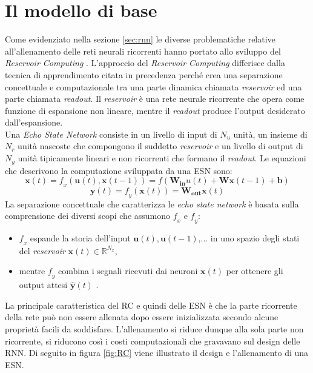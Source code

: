 
\section{Il modello di base}
Come evidenziato nella sezione \ref{sec:rnn} le diverse problematiche relative all'allenamento delle reti neurali ricorrenti hanno portato allo sviluppo del \textit{Reservoir Computing }. L'approccio del \textit{Reservoir Computing} differisce dalla tecnica di apprendimento citata in precedenza perché crea una separazione concettuale e computazionale tra una parte dinamica chiamata  \textit{reservoir} ed una parte chiamata \textit{readout}. Il \textit{reservoir} è una  rete neurale ricorrente che opera come funzione di espansione non lineare, mentre il \textit{readout} produce l'output desiderato dall'espansione. \\

Una \textit{Echo State Network} consiste in un livello di input di $N_u$ unità, un insieme di $N_r$ unità nascoste che compongono il suddetto \textit{reservoir} e un livello di output di $N_y$ unità tipicamente lineari e non ricorrenti che formano il \textit{readout}.
Le equazioni che descrivono la computazione sviluppata da una ESN sono:
\begin{equation}\label{attivazioneesn}
\mathbf{x}(\mathit{t})= \mathit{f}_\mathit{x} (\mathbf{u}(\mathit{t}), \mathbf{x}(\mathit{t} - 1)) = f(\mathbf{W_{in}}u(\mathit{t}) + \mathbf{Wx}(\mathit{t - 1} ) + \mathbf{b} )
\end{equation}
\begin{equation}\label{output}
\mathbf{y}(\mathit{t})=\mathit{f_{y}}(\mathbf{x}(\mathit{t}) )= \mathbf{W_{out}}\mathbf{x}(\mathit{t})
\end{equation}
La separazione concettuale che caratterizza le \textit{echo state network} è basata sulla comprensione dei diversi scopi che assumono $\mathit{f_{x}}$ e $\mathit{f_{y}}$:
\begin{itemize}
	\item $\mathit{f_{x}}$ espande la storia dell'input $\mathbf{u}\mathit{(t)}, \mathbf{u}\mathit{(t-1)}$,... in uno spazio degli stati del \textit{reservoir}  $\mathbf{x}\mathit{(t)} \in \mathds{R}^{N_x}$,
	\item mentre $\mathit{f_{y}}$ combina i segnali ricevuti dai neuroni $\mathbf{x}(\mathit{t})$ per ottenere gli output attesi $\hat{\mathbf{y}}(\mathit{t})$ .\\
\end{itemize}
  
La principale caratteristica del RC e quindi delle ESN è che la parte ricorrente della rete può non essere allenata dopo essere inizializzata secondo alcune proprietà facili da soddisfare. L'allenamento si riduce dunque alla sola parte non ricorrente, si riducono così i costi computazionali che gravavano sul design delle RNN. Di seguito in figura \ref{fig:RC} viene illustrato il design e l'allenamento di una ESN.\\

